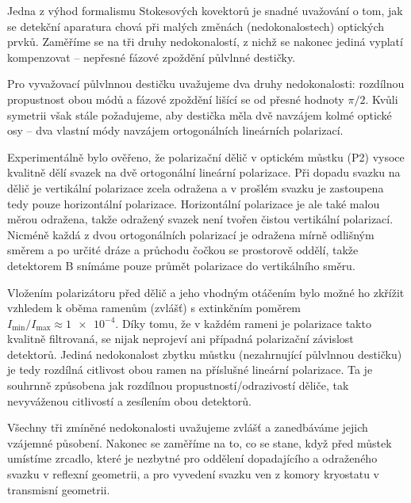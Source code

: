 Jedna z výhod formalismu Stokesových kovektorů je snadné uvažování o tom, jak se detekční aparatura chová při malých změnách (nedokonalostech) optických prvků.
Zaměříme se na tři druhy nedokonalostí, z nichž se nakonec jediná vyplatí kompenzovat -- nepřesné fázové zpoždění půlvlnné destičky.

Pro vyvažovací půlvlnnou destičku uvažujeme dva druhy nedokonalosti: rozdílnou propustnost obou módů a fázové zpoždění lišící se od přesné hodnoty $\pi/2$.
Kvůli symetrii však stále požadujeme, aby destička měla dvě navzájem kolmé optické osy -- dva vlastní módy navzájem ortogonálních lineárních polarizací.

Experimentálně bylo ověřeno, že polarizační dělič v optickém můstku (P2) vysoce kvalitně dělí svazek na dvě ortogonální lineární polarizace.
Při dopadu svazku na dělič je vertikální polarizace zcela odražena a v prošlém svazku je zastoupena tedy pouze horizontální polarizace.
Horizontální polarizace je ale také malou měrou odražena, takže odražený svazek není tvořen čistou vertikální polarizací. 
Nicméně každá z dvou ortogonálních polarizací je odražena mírně odlišným směrem a po určité dráze a průchodu čočkou se prostorově oddělí, takže detektorem B snímáme pouze průmět polarizace do vertikálního směru.

Vložením polarizátoru před dělič a jeho vhodným otáčením bylo možné ho zkřížit vzhledem k oběma ramenům (zvlášť) s extinkčním poměrem $I_\textrm{min}/I_\textrm{max} \approx \num{1e-4}$.
Díky tomu, že v každém rameni je polarizace takto kvalitně filtrovaná, se nijak neprojeví ani případná polarizační závislost detektorů.
Jediná nedokonalost zbytku můstku (nezahrnující půlvlnnou destičku) je tedy rozdílná citlivost obou ramen na příslušné lineární polarizace.
Ta je souhrnně způsobena jak rozdílnou propustností/odrazivostí děliče, tak nevyváženou citlivostí a zesílením obou detektorů.

Všechny tři zmíněné nedokonalosti uvažujeme zvlášť a zanedbáváme jejich vzájemné působení.
Nakonec se zaměříme na to, co se stane, když před můstek umístíme zrcadlo, které je nezbytné pro oddělení dopadajícího a odraženého svazku v reflexní geometrii, a pro vyvedení svazku ven z komory kryostatu v transmisní geometrii.


